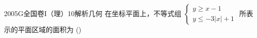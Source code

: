 
\begin{problem}{2005}{G}{全国卷I（理）}{10}{解析几何}
在坐标平面上，不等式组 $ \begin{cases} y\geq x-1 \\ y\leq -3|x|+1 \end{cases} $ 所表示的平面区域的面积为 (\hspace{1cm})
\begin{choices}
\end{choices}
\end{problem}

\begin{answer}

\end{answer}

\begin{solutions}

\end{solutions}
